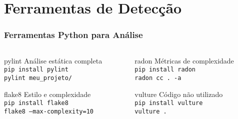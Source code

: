 \documentclass[aspectratio=169]{beamer}
\begin{document}
\section{Ferramentas de Detecção}

\begin{frame}
\frametitle{Ferramentas Python para Análise}
\begin{columns}
\begin{column}{0.5\textwidth}
\begin{block}{pylint}
\footnotesize
Análise estática completa\\
\texttt{pip install pylint}\\
\texttt{pylint meu\_projeto/}
\end{block}

\begin{block}{flake8}
\footnotesize
Estilo e complexidade\\
\texttt{pip install flake8}\\
\texttt{flake8 --max-complexity=10}
\end{block}
\end{column}

\begin{column}{0.5\textwidth}
\begin{block}{radon}
\footnotesize
Métricas de complexidade\\
\texttt{pip install radon}\\
\texttt{radon cc . -a}
\end{block}

\begin{block}{vulture}
\footnotesize
Código não utilizado\\
\texttt{pip install vulture}\\
\texttt{vulture .}
\end{block}
\end{column}
\end{columns}
\end{frame}
\end{document}
